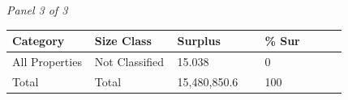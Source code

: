 \documentclass[12pt]{article}
\begin{document}
\begin{landscape}
\begin{table}[H]
\vspace{0.6em}

\textit{Panel 3 of 3}\\[2pt]
{\fontsize{12}{14}\selectfont
\setlength{\tabcolsep}{3pt}
\renewcommand{\arraystretch}{1.08}
\begin{tabular}{p{0.205\linewidth}p{0.205\linewidth}p{0.205\linewidth}p{0.205\linewidth}}
\toprule
Category & Size Class & Surplus & \% Sur \\
\midrule
All Properties & Not Classified & 15.038 & 0 \\
Total & Total & 15,480,850.6 & 100 \\
\bottomrule
\end{tabular}
}
\end{table}
\end{landscape}
\end{document}
